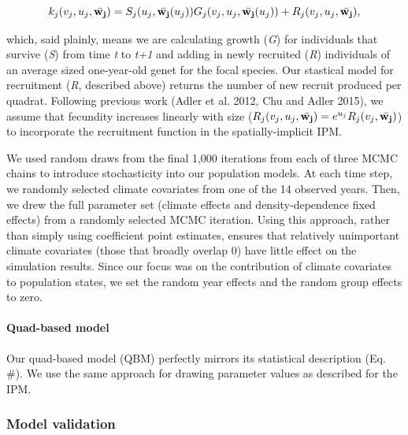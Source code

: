 \documentclass[12pt,]{article}
\begin{document}
\begin{equation}
k_{j}(v_{j},u_{j},\bar{\bold{w_{j}}}) = S_j(u_j, \bar{\bold{w_{j}}}(u_{j}))G_j(v_{j},u_{j},\bar{\bold{w_{j}}}(u_{j})) + R_j(v_{j},u_{j},\bar{\bold{w_{j}}}),
\end{equation}

which, said plainly, means we are calculating growth (\emph{G}) for
individuals that survive (\emph{S}) from time \emph{t} to \emph{t+1} and
adding in newly recruited (\emph{R}) individuals of an average sized
one-year-old genet for the focal species. Our stastical model for
recruitment (\emph{R}, described above) returns the number of new
recruit produced per quadrat. Following previous work (Adler et al.
2012, Chu and Adler 2015), we assume that fecundity increases linearly
with size
($R_j(v_{j},u_{j},\bar{\bold{w_{j}}}) = e^{u_j}R_j(v_{j},\bar{\bold{w_{j}}})$)
to incorporate the recruitment function in the spatially-implicit IPM.

We used random draws from the final 1,000 iterations from each of three
MCMC chains to introduce stochasticity into our population models. At
each time step, we randomly selected climate covariates from one of the
14 observed years. Then, we drew the full parameter set (climate effects
and density-dependence fixed effects) from a randomly selected MCMC
iteration. Using this approach, rather than simply using coefficient
point estimates, ensures that relatively unimportant climate covariates
(those that broadly overlap 0) have little effect on the simulation
results. Since our focus was on the contribution of climate covariates
to population states, we set the random year effects and the random
group effects to zero.

\paragraph{Quad-based model}\label{quad-based-model}

Our quad-based model (QBM) perfectly mirrors its statistical description
(Eq. \#). We use the same approach for drawing parameter values as
described for the IPM.

\subsubsection{Model validation}\label{model-validation}
\end{document}
